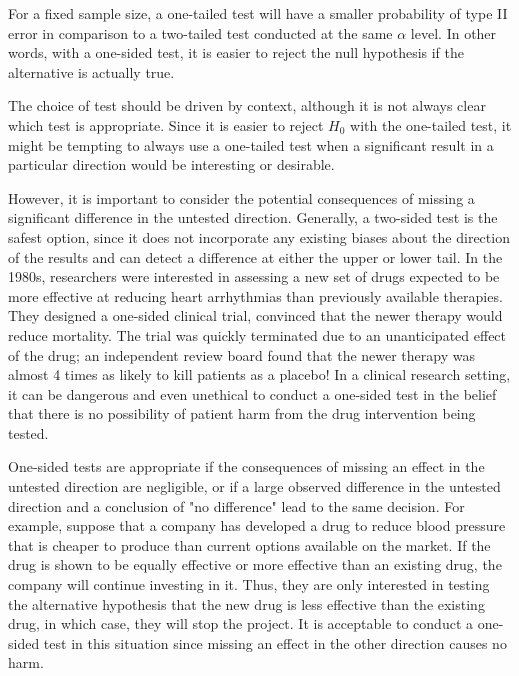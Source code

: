 \begin{spacing}{1.5}
For a fixed sample size, a one-tailed test will have a smaller probability of type II error in comparison to a two-tailed test conducted at the same $\alpha$ level. In other words, with a one-sided test, it is easier to reject the null hypothesis if the alternative is actually true. 

The choice of test should be driven by context, although it is not always clear which test is appropriate. Since it is easier to reject $H_0$ with the one-tailed test, it might be tempting to always use a one-tailed test when a significant result in a particular direction would be interesting or desirable. 

However, it is important to consider the potential consequences of missing a significant difference in the untested direction. Generally, a two-sided test is the safest option, since it does not incorporate any existing biases about the direction of the results and can detect a difference at either the upper or lower tail. In the 1980s, researchers were interested in assessing a new set of drugs expected to be more effective at reducing heart arrhythmias than previously available therapies. They designed a one-sided clinical trial, convinced that the newer therapy would reduce mortality. The trial was quickly terminated due to an unanticipated effect of the drug; an independent review board found that the newer therapy was almost 4 times as likely to kill patients as a placebo! In a clinical research setting, it can be dangerous and even unethical to conduct a one-sided test in the belief that there is no possibility of patient harm from the drug intervention being tested.


One-sided tests are appropriate if the consequences of missing an effect in the untested direction are negligible, or if a large observed difference in the untested direction and a conclusion of "no difference" lead to the same decision. For example, suppose that a company has developed a drug to reduce blood pressure that is cheaper to produce than current options available on the market. If the drug is shown to be equally effective or more effective than an existing drug, the company will continue investing in it. Thus, they are only interested in testing the alternative hypothesis that the new drug is less effective than the existing drug, in which case, they will stop the project. It is acceptable to conduct a one-sided test in this situation since missing an effect in the other direction causes no harm. 


\end{spacing}
